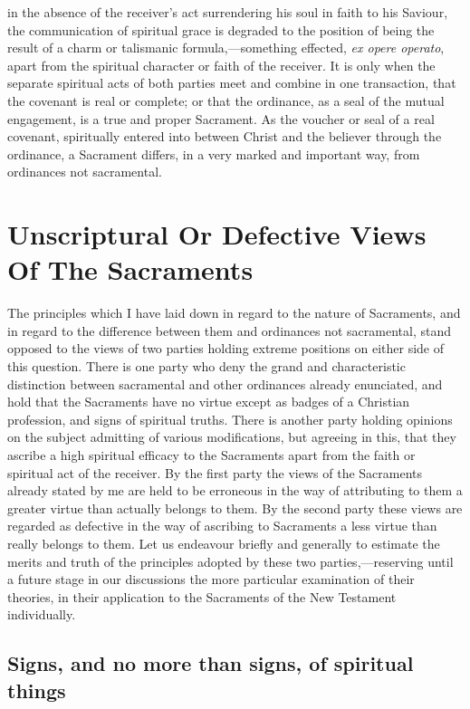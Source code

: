 \documentclass[]{book}
\begin{document}
in the absence of the receiver's act surrendering his soul in faith to his Saviour, the communication of spiritual grace is degraded to the position of being the result of a charm or talismanic formula,---something effected, \emph{ex opere operato}, apart from the spiritual character or faith of the receiver. It is only when the separate spiritual acts of both parties meet and combine in one transaction, that the covenant is real or complete; or that the ordinance, as a seal of the mutual engagement, is a true and proper Sacrament. As the voucher or seal of a real covenant, spiritually entered into between Christ and the believer through the ordinance, a Sacrament differs, in a very marked and important way, from ordinances not sacramental.

\hypertarget{unscriptural-or-defective-views-of-the-sacraments}{%
\section{Unscriptural Or Defective Views Of The Sacraments}\label{unscriptural-or-defective-views-of-the-sacraments}}

The principles which I have laid down in regard to the nature of Sacraments, and in regard to the difference between them and ordinances not sacramental, stand opposed to the views of two parties holding extreme positions on either side of this question. There is one party who deny the grand and characteristic distinction between sacramental and other ordinances already enunciated, and hold that the Sacraments have no virtue except as badges of a Christian profession, and signs of spiritual truths. There is another party holding opinions on the subject admitting of various modifications, but agreeing in this, that they ascribe a high spiritual efficacy to the Sacraments apart from the faith or spiritual act of the receiver. By the first party the views of the Sacraments already stated by me are held to be erroneous in the way of attributing to them a greater virtue than actually belongs to them. By the second party these views are regarded as defective in the way of ascribing to Sacraments a less virtue than really belongs to them. Let us endeavour briefly and generally to estimate the merits and truth of the principles adopted by these two parties,---reserving until a future stage in our discussions the more particular examination of their theories, in their application to the Sacraments of the New Testament individually.

\hypertarget{signs-and-no-more-than-signs-of-spiritual-things}{%
\subsection{Signs, and no more than signs, of spiritual things}\label{signs-and-no-more-than-signs-of-spiritual-things}}
\end{document}

